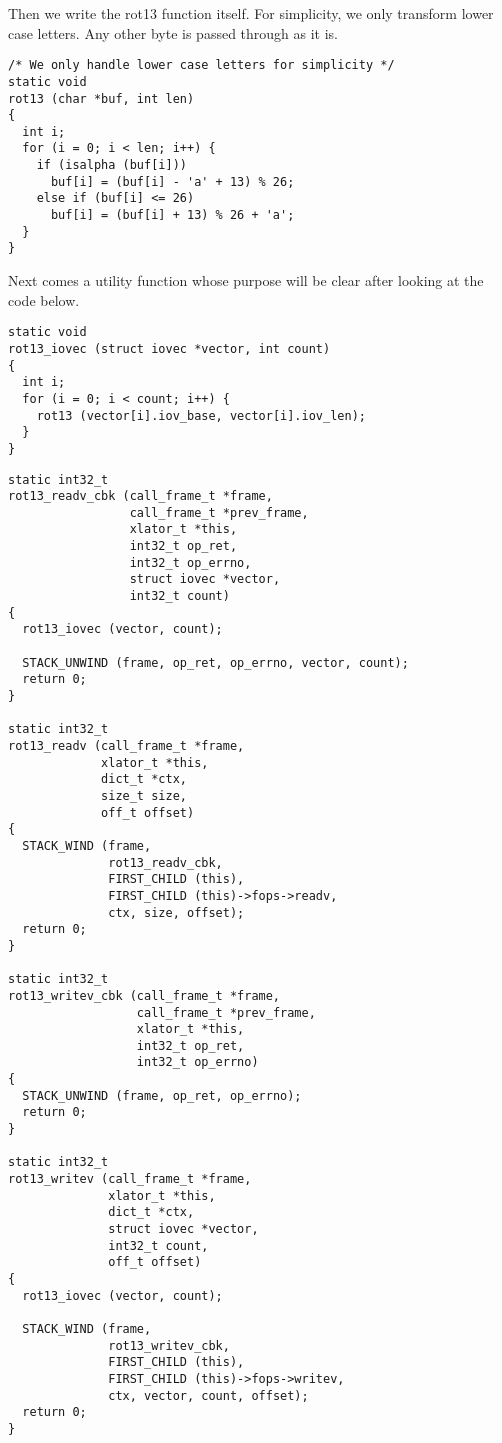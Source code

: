 \documentclass{book}[12pt]
\begin{document}
Then we write the rot13 function itself. For simplicity, we only transform lower case
letters. Any other byte is passed through as it is.

\begin{verbatim}
/* We only handle lower case letters for simplicity */
static void 
rot13 (char *buf, int len)
{
  int i;
  for (i = 0; i < len; i++) {
    if (isalpha (buf[i]))
      buf[i] = (buf[i] - 'a' + 13) % 26;
    else if (buf[i] <= 26)
      buf[i] = (buf[i] + 13) % 26 + 'a';
  }
}
\end{verbatim}

Next comes a utility function whose purpose will be clear after looking at the code
below.

\begin{verbatim}
static void
rot13_iovec (struct iovec *vector, int count)
{
  int i;
  for (i = 0; i < count; i++) {
    rot13 (vector[i].iov_base, vector[i].iov_len);
  }
}
\end{verbatim}

\begin{verbatim}
static int32_t
rot13_readv_cbk (call_frame_t *frame,
                 call_frame_t *prev_frame,
                 xlator_t *this,
                 int32_t op_ret,
                 int32_t op_errno,
                 struct iovec *vector,
                 int32_t count)
{
  rot13_iovec (vector, count);

  STACK_UNWIND (frame, op_ret, op_errno, vector, count);
  return 0;
}

static int32_t
rot13_readv (call_frame_t *frame,
             xlator_t *this,
             dict_t *ctx,
             size_t size,
             off_t offset)
{
  STACK_WIND (frame,
              rot13_readv_cbk,
              FIRST_CHILD (this),
              FIRST_CHILD (this)->fops->readv,
              ctx, size, offset);
  return 0;
}

static int32_t
rot13_writev_cbk (call_frame_t *frame,
                  call_frame_t *prev_frame,
                  xlator_t *this,
                  int32_t op_ret,
                  int32_t op_errno)
{
  STACK_UNWIND (frame, op_ret, op_errno);
  return 0;
}

static int32_t
rot13_writev (call_frame_t *frame,
              xlator_t *this,
              dict_t *ctx,
              struct iovec *vector,
              int32_t count, 
              off_t offset)
{
  rot13_iovec (vector, count);

  STACK_WIND (frame, 
              rot13_writev_cbk,
              FIRST_CHILD (this),
              FIRST_CHILD (this)->fops->writev,
              ctx, vector, count, offset);
  return 0;
}

\end{verbatim}
\end{document}
